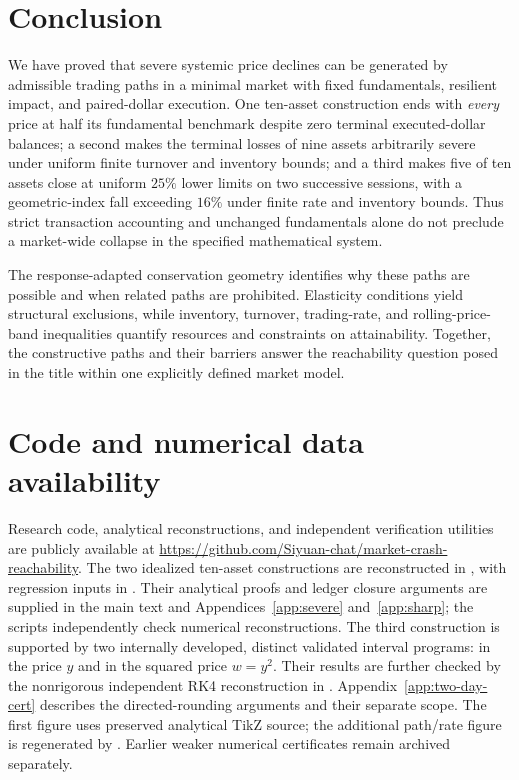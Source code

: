 \documentclass[review,hidelinks,onefignum,onetabnum]{siamonline250211}
\begin{document}
\section{Conclusion}\label{sec:conclusion}
We have proved that severe systemic price declines can be generated by admissible trading paths in a minimal market with fixed fundamentals, resilient impact, and paired-dollar execution. One ten-asset construction ends with \emph{every} price at half its fundamental benchmark despite zero terminal executed-dollar balances; a second makes the terminal losses of nine assets arbitrarily severe under uniform finite turnover and inventory bounds; and a third makes five of ten assets close at uniform $25\%$ lower limits on two successive sessions, with a geometric-index fall exceeding $16\%$ under finite rate and inventory bounds. Thus strict transaction accounting and unchanged fundamentals alone do not preclude a market-wide collapse in the specified mathematical system.

The response-adapted conservation geometry identifies why these paths are possible and when related paths are prohibited. Elasticity conditions yield structural exclusions, while inventory, turnover, trading-rate, and rolling-price-band inequalities quantify resources and constraints on attainability. Together, the constructive paths and their barriers answer the reachability question posed in the title within one explicitly defined market model.

\section*{Code and numerical data availability}
Research code, analytical reconstructions, and independent verification utilities are publicly available at \url{https://github.com/Siyuan-chat/market-crash-reachability}. The two idealized ten-asset constructions are reconstructed in , with regression inputs in . Their analytical proofs and ledger closure arguments are supplied in the main text and Appendices~\ref{app:severe} and~\ref{app:sharp}; the scripts independently check numerical reconstructions. The third construction is supported by two internally developed, distinct validated interval programs:  in the price $y$ and  in the squared price $w=y^2$. Their results are further checked by the nonrigorous independent RK4 reconstruction in . Appendix~\ref{app:two-day-cert} describes the directed-rounding arguments and their separate scope. The first figure uses preserved analytical TikZ source; the additional path/rate figure is regenerated by . Earlier weaker numerical certificates remain archived separately.
\end{document}
